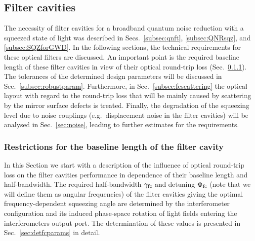 \FloatBarrier
\subsection{Filter cavities}\label{app:filtercavities}

The necessity of filter cavities for a broadband quantum noise reduction with a squeezed state of light was described in Secs.~\ref{subsec:qnft}, \ref{subsec:QNRsqz}, and \ref{subsec:SQZforGWD}. In the following sections, the technical requirements for these optical filters are discussed. An important point is the required baseline length of these filter cavities in view of their optical round-trip loss (Sec.~\ref{subsec:FClength}). The tolerances of the determined design parameters will be discussed in Sec.~\ref{subsec:robustparam}.   Furthermore, in Sec.~\ref{subsec:fcscattering} the optical layout with regard to the round-trip loss that will be mainly caused by scattering by the mirror surface defects is treated. Finally, the degradation of the squeezing level due to noise couplings (e.g.\ displacement noise in the filter cavities) will be analysed in Sec.~\ref{sec:noise}, leading to further estimates for the requirements.


\FloatBarrier
\subsubsection{Restrictions for the baseline length of the filter cavity}\label{subsec:FClength}


In this Section we start with a description of the influence of optical round-trip loss on the filter cavities performance in dependence of their baseline length and half-bandwidth. The required half-bandwidth $\gamma_{\rm fc}$ and detuning
$\Phi_{\rm fc}$
(note that we will define them as angular
frequencies) of the filter cavities giving the optimal frequency-dependent squeezing angle are determined by the interferometer
configuration and its induced phase-space rotation of light fields
entering the interferometers output port. The determination of these values is presented in Sec.~\ref{sec:detfcparams} in detail.

